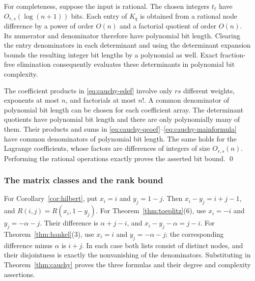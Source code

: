 \documentclass[11pt,reqno]{amsart}
\theoremstyle{remark}
\numberwithin{equation}{section}
\begin{document}
For completeness, suppose the input is rational. The chosen
integers $t_\ell$ have $O_{r,s}(\log(n+1))$ bits. Each entry
of $K_q$ is obtained from a rational node difference by a power
of order $O(n)$ and a factorial quotient of order $O(n)$.
Its numerator and denominator therefore have polynomial bit
length. Clearing the entry denominators in each determinant
and using the determinant expansion bounds the resulting
integer bit lengths by a polynomial as well. Exact
fraction-free elimination consequently evaluates these
determinants in polynomial bit complexity.

The coefficient products in \eqref{eq:cauchy-edef} involve only $rs$
different weights, exponents at most $n$, and factorials at
most $n!$. A common denominator of polynomial bit length can
be chosen for each coefficient array. The determinant
quotients have polynomial bit length and there are only
polynomially many of them. Their products and sums in
\eqref{eq:cauchy-qcoef}--\eqref{eq:cauchy-mainformula} have common denominators
of polynomial bit length. The same holds for the
Lagrange coefficients, whose factors are differences of
integers of size $O_{r,s}(n)$. Performing the rational
operations exactly proves the asserted bit bound.
\qed

\subsubsection{The matrix classes and the rank bound}

For Corollary~\ref{cor:hilbert}, put \(x_i=i\) and \(y_j=1-j\).
Then \(x_i-y_j=i+j-1\), and \(R(i,j)=R(x_i,1-y_j)\).
For Theorem~\ref{thm:toeplitz}(6), use \(x_i=-i\) and
\(y_j=-\alpha-j\). Their difference is \(\alpha+j-i\),
and \(x_i-y_j-\alpha=j-i\). For
Theorem~\ref{thm:hankel}(3), use \(x_i=i\) and
\(y_j=-\alpha-j\); the corresponding difference minus
\(\alpha\) is \(i+j\). In each case both lists consist of
distinct nodes, and their disjointness is exactly the
nonvanishing of the denominators. Substituting in
Theorem~\ref{thm:cauchy} proves the three formulas and their
degree and complexity assertions.
\end{document}
